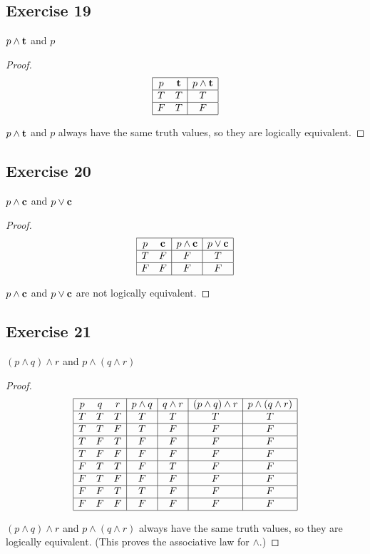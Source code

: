\documentclass[14pt]{extarticle}
\newcommand{\false}{{\bf c}} \newcommand{\bic}{\leftrightarrow}
\begin{document}
\subsection{Exercise 19} $p \wedge {\bf t}$ and $p$
\begin{proof} $$ \begin{array}{|cc|c|} \hline p & {\bf t} & p \wedge {\bf t} \\
\hline T & T & T \\ \hline F & T & F \\ \hline \end{array} $$

$p \wedge {\bf t}$ and $p$ always have the same truth values, so they are
logically equivalent. \end{proof}

\subsection{Exercise 20} $p \wedge \false$ and $p \vee \false$
\begin{proof} $$ \begin{array}{|cc|c|c|} \hline p & \false & p \wedge \false & p
\vee \false \\ \hline T & F & F & T \\ \hline F & F & F & F \\ \hline
\end{array} $$

$p \wedge \false$ and $p \vee \false$ are not logically equivalent. \end{proof}
\subsection{Exercise 21} $(p \wedge q) \wedge r$ and $p \wedge (q \wedge r)$
\begin{proof} $$ \begin{array}{|ccc|c|c|c|c|} \hline p & q & r & p \wedge q & q
\wedge r & (p \wedge q) \wedge r & p \wedge (q \wedge r) \\ \hline T & T & T & T
& T & T & T \\ \hline T & T & F & T & F & F & F \\ \hline T & F & T & F & F & F
& F \\ \hline T & F & F & F & F & F & F \\ \hline F & T & T & F & T & F & F \\
\hline F & T & F & F & F & F & F \\ \hline F & F & T & T & F & F & F \\ \hline F
& F & F & F & F & F & F \\ \hline \end{array} $$

$(p \wedge q) \wedge r$ and $p \wedge (q \wedge r)$ always have the same truth
values, so they are logically equivalent. (This proves the associative law for
$\wedge$.) \end{proof}
\end{document}
